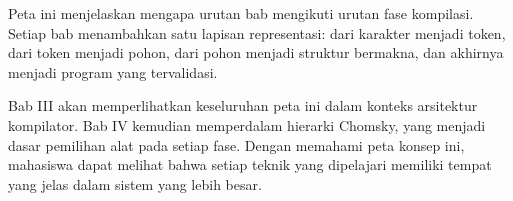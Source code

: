 Peta ini menjelaskan mengapa urutan bab mengikuti urutan fase
kompilasi. Setiap bab menambahkan satu lapisan representasi: dari
karakter menjadi token, dari token menjadi pohon, dari pohon menjadi
struktur bermakna, dan akhirnya menjadi program yang tervalidasi.

Bab III akan memperlihatkan keseluruhan peta ini dalam konteks
arsitektur kompilator. Bab IV kemudian memperdalam hierarki Chomsky,
yang menjadi dasar pemilihan alat pada setiap fase. Dengan memahami
peta konsep ini, mahasiswa dapat melihat bahwa setiap teknik yang
dipelajari memiliki tempat yang jelas dalam sistem yang lebih besar.
